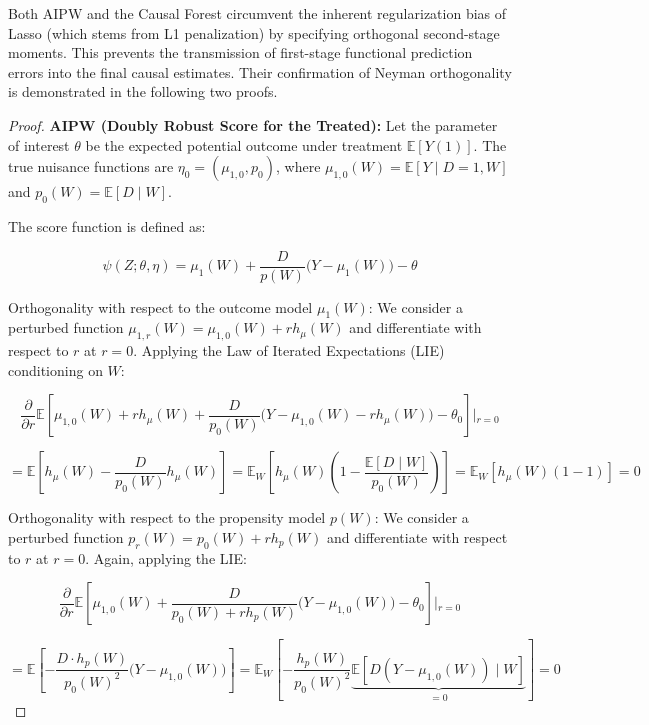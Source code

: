 \documentclass[12pt, a4paper]{article}
\begin{document}
Both AIPW and the Causal Forest circumvent the inherent regularization bias of Lasso (which stems from L1 penalization) by specifying orthogonal second-stage moments. This prevents the transmission of first-stage functional prediction errors into the final causal estimates. Their confirmation of Neyman orthogonality is demonstrated in the following two proofs.

\begin{proof}\label{proof:Neyman_orthogonality_aipw}
\textbf{AIPW (Doubly Robust Score for the Treated): }Let the parameter of interest $\theta$ be the expected potential outcome under treatment $\mathbb{E}[Y(1)]$. The true nuisance functions are $\eta_0 = (\mu_{1,0}, p_0)$, where $\mu_{1,0}(W) = \mathbb{E}[Y \mid D=1, W]$ and $p_0(W) = \mathbb{E}[D \mid W]$.

The score function is defined as:


$$\psi(Z; \theta, \eta) = \mu_1(W) + \frac{D}{p(W)}\Big(Y - \mu_1(W)\Big) - \theta$$

Orthogonality with respect to the outcome model $\mu_1(W)$:
We consider a perturbed function $\mu_{1,r}(W) = \mu_{1,0}(W) + r h_\mu(W)$ and differentiate with respect to $r$ at $r=0$. Applying the Law of Iterated Expectations (LIE) conditioning on $W$:


$$\frac{\partial}{\partial r} \mathbb{E}\left[ \mu_{1,0}(W) + r h_\mu(W) + \frac{D}{p_0(W)}\Big(Y - \mu_{1,0}(W) - r h_\mu(W)\Big) - \theta_0 \right] \Bigg\vert{}_{r=0}$$

$$= \mathbb{E}\left[ h_\mu(W) - \frac{D}{p_0(W)}h_\mu(W) \right] = \mathbb{E}_W\left[ h_\mu(W) \left( 1 - \frac{\mathbb{E}[D \mid W]}{p_0(W)} \right) \right] = \mathbb{E}_W\left[ h_\mu(W) ( 1 - 1 ) \right] = 0$$

Orthogonality with respect to the propensity model $p(W)$:
We consider a perturbed function $p_r(W) = p_0(W) + r h_p(W)$ and differentiate with respect to $r$ at $r=0$. Again, applying the LIE:


$$\frac{\partial}{\partial r} \mathbb{E}\left[ \mu_{1,0}(W) + \frac{D}{p_0(W) + r h_p(W)}\Big(Y - \mu_{1,0}(W)\Big) - \theta_0 \right] \Bigg\vert{}_{r=0}$$

$$= \mathbb{E}\left[ -\frac{D \cdot h_p(W)}{p_0(W)^2}\Big(Y - \mu_{1,0}(W)\Big) \right] = \mathbb{E}_W\left[ -\frac{h_p(W)}{p_0(W)^2} \underbrace{\mathbb{E}[D(Y - \mu_{1,0}(W)) \mid W]}_{=0} \right] = 0$$


\end{proof}
\end{document}
